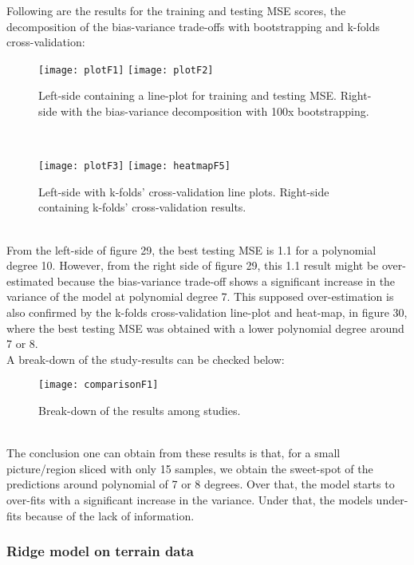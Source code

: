Following are the results for the training and testing MSE scores, the decomposition of the bias-variance trade-offs with bootstrapping and k-folds cross-validation: \\

\begin{figure}[H]
\label{fig:plotF1andF2}
\centering
\texttt{[image: plotF1]}
\texttt{[image: plotF2]}
\caption{Left-side containing a line-plot for training and testing MSE. Right-side with the bias-variance decomposition with 100x bootstrapping.}
\end{figure}\\

\begin{figure}[H]
\label{fig:plotF3andH5}
\centering
\texttt{[image: plotF3]}
\texttt{[image: heatmapF5]}
\caption{Left-side with k-folds' cross-validation line plots. Right-side containing k-folds' cross-validation results.}
\end{figure}\\

From the left-side of figure 29, the best testing MSE is 1.1 for a polynomial degree 10. However, from the right side of figure 29, this 1.1 result might be over-estimated because the bias-variance trade-off shows a significant increase in the variance of the model at polynomial degree 7. This supposed over-estimation is also confirmed by the k-folds cross-validation line-plot and heat-map, in figure 30, where the best testing MSE was obtained with a lower polynomial degree around 7 or 8. \\

A break-down of the study-results can be checked below: \\

\begin{figure}[H]
\label{fig:comparisonF1}
\centering
\texttt{[image: comparisonF1]}
\caption{Break-down of the results among studies.}
\end{figure}\\

The conclusion one can obtain from these results is that, for a small picture/region sliced with only 15 samples, we obtain the sweet-spot of the predictions around polynomial of 7 or 8 degrees. Over that, the model starts to over-fits with a significant increase in the variance. Under that, the models under-fits because of the lack of information. \\

\subsubsection{Ridge model on terrain data}
\label{chap:Ridge model on terrain data}


